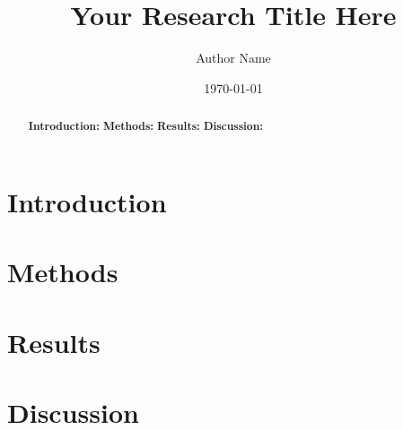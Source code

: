 \documentclass{article}
\title{Your Research Title Here}
\author{Author Name}
\date{\today}
\begin{document}
\maketitle

\begin{abstract}
\textbf{Introduction:} \lipsum[1] %
\textbf{Methods:} \lipsum[2] %
\textbf{Results:} \lipsum[3] %
\textbf{Discussion:} \lipsum[4] %
\end{abstract}

\section{Introduction}
\lipsum[1] %

\section{Methods}
\lipsum[2] %

\section{Results}
\lipsum[3] %

\section{Discussion}
\lipsum[4] %
\end{document}
